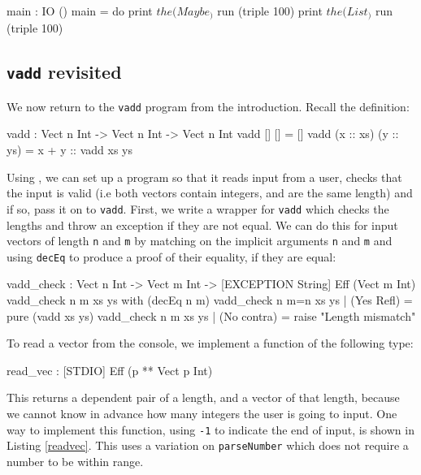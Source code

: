 \begin{code}
main : IO ()
main = do print $ the (Maybe _) $ run (triple 100)
          print $ the (List _) $ run (triple 100)
\end{code}

\subsection{\texttt{vadd} revisited}

We now return to the \texttt{vadd} program from the introduction. Recall the
definition:

\begin{code}
vadd : Vect n Int -> Vect n Int -> Vect n Int
vadd []        []        = []
vadd (x :: xs) (y :: ys) = x + y :: vadd xs ys
\end{code}

\noindent
Using \effects{}, we can set up a program so that it reads input from a user,
checks that the input is valid (i.e both vectors contain integers, and are
the same length) and if so, pass it on to \texttt{vadd}. First, we write
a wrapper for \texttt{vadd} which checks the lengths and throw an exception
if they are not equal. We can do this for input vectors of length \texttt{n}
and \texttt{m} by matching on the implicit arguments \texttt{n} and
\texttt{m} and using \texttt{decEq} to produce a proof of their equality,
if they are equal:

\begin{code}
vadd_check : Vect n Int -> Vect m Int ->
             { [EXCEPTION String] } Eff (Vect m Int)
vadd_check {n} {m} xs ys with (decEq n m)
  vadd_check {n} {m=n} xs ys | (Yes Refl) = pure (vadd xs ys)
  vadd_check {n} {m}   xs ys | (No contra) = raise "Length mismatch"
\end{code}

\noindent
To read a vector from the console, we implement a function of the following
type:

\begin{code}
read_vec : { [STDIO] } Eff (p ** Vect p Int)
\end{code}

\noindent
This returns a dependent pair of a length, and a vector of that length, because
we cannot know in advance how many integers the user is going to input.
One way to implement this function, using \texttt{-1} to indicate the end
of input, is shown in Listing \ref{readvec}. This uses a variation on
\texttt{parseNumber} which does not require a number to be within range.

